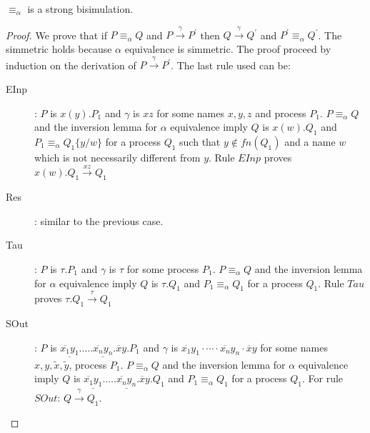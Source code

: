 \begin{proposition}
  $\equiv_{\alpha}$ is a strong bisimulation.
  \begin{proof}
    We prove that if $P \equiv_{\alpha} Q$ and $P \xrightarrow{\gamma} P^{'}$ then $Q \xrightarrow{\gamma} Q^{'}$ and $P^{'}\equiv_{\alpha} Q^{'}$. The simmetric holds because $\alpha$ equivalence is simmetric. The proof proceed by induction on the derivation of $P \xrightarrow{\gamma} P^{'}$. The last rule used can be:
    \begin{description}
      \item[EInp]:
	$P$ is $x(y).P_{1}$ and $\gamma$ is $xz$ for some names $x,y,z$ and process $P_{1}$.	$P \equiv_{\alpha} Q$ and the inversion lemma for $\alpha$ equivalence imply $Q$ is $x(w).Q_{1}$ and $P_{1}\equiv_{\alpha}Q_{1}\{y/w\}$ for a process $Q_{1}$ such that $y\notin fn(Q_{1})$ and a name $w$ which is not necessarily different from $y$. Rule $EInp$ proves $x(w).Q_{1} \xrightarrow{xz} Q_{1}$
      \item[Res]: similar to the previous case.
      \item[Tau]:
	$P$ is $\tau.P_{1}$ and $\gamma$ is $\tau$ for some process $P_{1}$. $P \equiv_{\alpha} Q$ and the inversion lemma for $\alpha$ equivalence imply $Q$ is $\tau.Q_{1}$ and $P_{1}\equiv_{\alpha}Q_{1}$ for a process $Q_{1}$. Rule $Tau$ proves $\tau.Q_{1} \xrightarrow{\tau} Q_{1}$
      \item[SOut]:
	$P$ is $\underline{\overline{x_{1}}y_{1}}.\ldots.\underline{\overline{x_{n}}y_{n}}.\overline{x}y.P_{1}$ and $\gamma$ is $\overline{x_{1}}y_{1} \cdot \cdots \cdot \overline{x_{n}}y_{n}\cdot \overline{x}y$ for some names $x,y,\tilde{x},\tilde{y}$, process $P_{1}$. $P \equiv_{\alpha} Q$ and the inversion lemma for $\alpha$ equivalence imply $Q$ is $\underline{\overline{x_{1}}y_{1}}.\ldots.\underline{\overline{x_{n}}y_{n}}.\overline{x}y.Q_{1}$ and $P_{1}\equiv_{\alpha}Q_{1}$ for a process $Q_{1}$. For rule $SOut$: $Q\xrightarrow{\gamma}Q_{1}$.

\end{description}
\end{proof}
\end{proposition}
